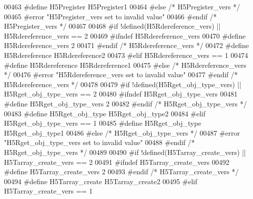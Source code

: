 \begin{DoxyCode}
00463 \textcolor{preprocessor}{  #define H5Pregister H5Pregister1}
00464 \textcolor{preprocessor}{#else }\textcolor{comment}{/* H5Pregister\_vers */}\textcolor{preprocessor}{}
00465 \textcolor{preprocessor}{  #error "H5Pregister\_vers set to invalid value"}
00466 \textcolor{preprocessor}{#endif }\textcolor{comment}{/* H5Pregister\_vers */}\textcolor{preprocessor}{}
00467 
00468 \textcolor{preprocessor}{#if !defined(H5Rdereference\_vers) || H5Rdereference\_vers == 2}
00469 \textcolor{preprocessor}{  #ifndef H5Rdereference\_vers}
00470 \textcolor{preprocessor}{    #define H5Rdereference\_vers 2}
00471 \textcolor{preprocessor}{  #endif }\textcolor{comment}{/* H5Rdereference\_vers */}\textcolor{preprocessor}{}
00472 \textcolor{preprocessor}{  #define H5Rdereference H5Rdereference2}
00473 \textcolor{preprocessor}{#elif H5Rdereference\_vers == 1}
00474 \textcolor{preprocessor}{  #define H5Rdereference H5Rdereference1}
00475 \textcolor{preprocessor}{#else }\textcolor{comment}{/* H5Rdereference\_vers */}\textcolor{preprocessor}{}
00476 \textcolor{preprocessor}{  #error "H5Rdereference\_vers set to invalid value"}
00477 \textcolor{preprocessor}{#endif }\textcolor{comment}{/* H5Rdereference\_vers */}\textcolor{preprocessor}{}
00478 
00479 \textcolor{preprocessor}{#if !defined(H5Rget\_obj\_type\_vers) || H5Rget\_obj\_type\_vers == 2}
00480 \textcolor{preprocessor}{  #ifndef H5Rget\_obj\_type\_vers}
00481 \textcolor{preprocessor}{    #define H5Rget\_obj\_type\_vers 2}
00482 \textcolor{preprocessor}{  #endif }\textcolor{comment}{/* H5Rget\_obj\_type\_vers */}\textcolor{preprocessor}{}
00483 \textcolor{preprocessor}{  #define H5Rget\_obj\_type H5Rget\_obj\_type2}
00484 \textcolor{preprocessor}{#elif H5Rget\_obj\_type\_vers == 1}
00485 \textcolor{preprocessor}{  #define H5Rget\_obj\_type H5Rget\_obj\_type1}
00486 \textcolor{preprocessor}{#else }\textcolor{comment}{/* H5Rget\_obj\_type\_vers */}\textcolor{preprocessor}{}
00487 \textcolor{preprocessor}{  #error "H5Rget\_obj\_type\_vers set to invalid value"}
00488 \textcolor{preprocessor}{#endif }\textcolor{comment}{/* H5Rget\_obj\_type\_vers */}\textcolor{preprocessor}{}
00489 
00490 \textcolor{preprocessor}{#if !defined(H5Tarray\_create\_vers) || H5Tarray\_create\_vers == 2}
00491 \textcolor{preprocessor}{  #ifndef H5Tarray\_create\_vers}
00492 \textcolor{preprocessor}{    #define H5Tarray\_create\_vers 2}
00493 \textcolor{preprocessor}{  #endif }\textcolor{comment}{/* H5Tarray\_create\_vers */}\textcolor{preprocessor}{}
00494 \textcolor{preprocessor}{  #define H5Tarray\_create H5Tarray\_create2}
00495 \textcolor{preprocessor}{#elif H5Tarray\_create\_vers == 1}

\end{DoxyCode}
